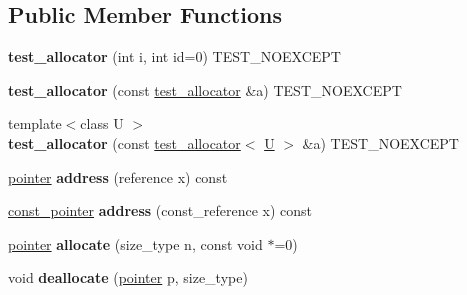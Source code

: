\subsection*{Public Member Functions}
\begin{DoxyCompactItemize}
\item 
\mbox{\label{classtest__allocator_a7a3abea5e94607ce5b12d8dbda3af6fd}} 
{\bfseries test\+\_\+allocator} (int i, int id=0) T\+E\+S\+T\+\_\+\+N\+O\+E\+X\+C\+E\+PT
\item 
\mbox{\label{classtest__allocator_a146456b9f347ba3593876f6d15790244}} 
{\bfseries test\+\_\+allocator} (const \mbox{\hyperlink{classtest__allocator}{test\+\_\+allocator}} \&a) T\+E\+S\+T\+\_\+\+N\+O\+E\+X\+C\+E\+PT
\item 
\mbox{\label{classtest__allocator_a3756a077bd48c9565c3e10fddc8f6a92}} 
{\footnotesize template$<$class U $>$ }\\{\bfseries test\+\_\+allocator} (const \mbox{\hyperlink{classtest__allocator}{test\+\_\+allocator}}$<$ \mbox{\hyperlink{union_u}{U}} $>$ \&a) T\+E\+S\+T\+\_\+\+N\+O\+E\+X\+C\+E\+PT
\item 
\mbox{\label{classtest__allocator_a7316a50aa8c6fe09d7080ae6a38d2220}} 
\mbox{\hyperlink{struct_t}{pointer}} {\bfseries address} (reference x) const
\item 
\mbox{\label{classtest__allocator_a670d27ce5e1b281b94022490b3dc461f}} 
\mbox{\hyperlink{struct_t}{const\+\_\+pointer}} {\bfseries address} (const\+\_\+reference x) const
\item 
\mbox{\label{classtest__allocator_a3ebdb97b7a31b48997427c6655f0ccae}} 
\mbox{\hyperlink{struct_t}{pointer}} {\bfseries allocate} (size\+\_\+type n, const void $\ast$=0)
\item 
\mbox{\label{classtest__allocator_a7ebfb1522ca22551ad1806c0db8fde80}} 
void {\bfseries deallocate} (\mbox{\hyperlink{struct_t}{pointer}} p, size\+\_\+type)
\item 
\mbox{\label{classtest__allocator_afb172ad7dd021db750a1fcf73dc23f57}} 

\end{DoxyCompactItemize}
